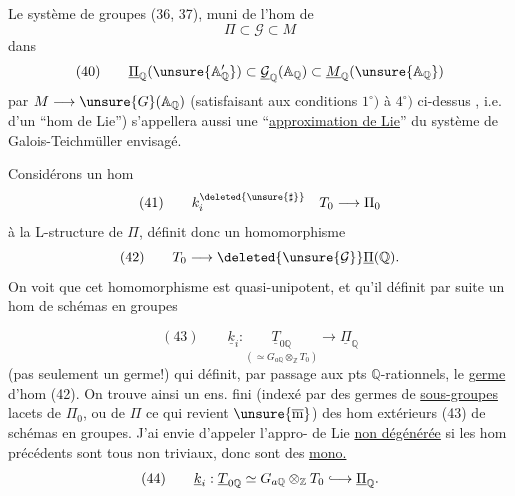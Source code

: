 Le système de groupes  (36, 37), muni
de l'hom de
\[
\Pi \subset \mathcal{G} \subset M
\]
dans 
\[
(40)\qquad
\underline{\Pi}_{\mathbb{Q}}(\unsure{\mathbb{A}'_{\mathbb{Q}}})
\subset \underline{\mathcal{G}}_{\mathbb{Q}}(\mathbb{A}_{\mathbb{Q}})
\subset \underline{M}_{\mathbb{Q}}(\unsure{\mathbb{A}_{\mathbb{Q}}})
\]
  par
$M\longrightarrow \unsure{G}(\mathbb{A}_{\mathbb{Q}})$ (satisfaisant
aux conditions $1^\circ)$ à $4^\circ)$ ci-dessus \deleted{\unsure{)}}, i.e.
d'un ``hom de Lie'') s'appellera aussi
une ``\uline{approximation de Lie}'' du
système de Galois-Teichmüller envisagé.

Considérons un hom
\[
(41)\qquad k_i^{\deleted{\unsure{\sharp}}}\quad T_0\longrightarrow\Pi_0
\]
 à la L-structure de $\Pi$,
définit donc 
un homomorphisme
\[
(42)\qquad T_0\longrightarrow
\deleted{\unsure{\mathcal{G}}}\underline{\Pi}(\mathbb{Q}).
\]
On voit  que cet  homomorphisme
est quasi-unipotent, et qu'il définit par
suite un hom de  schémas en groupes

\[
(43)\qquad \underline{k}_i:
\underset{(\simeq G_{a\mathbb{Q}}\otimes_{\mathbb{Z}}T_0)}{\underline{T}_{0\mathbb{Q}}}
\longrightarrow \underline{\Pi}_{\mathbb{Q}}
\]
(pas seulement un germe!)
qui définit, par  passage aux
pts $\mathbb{Q}$-rationnels, le \uline{germe} d'hom
(42). On trouve ainsi un ens. fini
(indexé par  des germes de \uline{sous-groupes}
lacets de $\Pi_0$, ou de $\Pi$ ce qui revient 
$\unsure{\overline{\mathrm m}}$) des hom extérieurs (43) de schémas
en groupes. J'ai envie d'appeler l'appro- de Lie \uline{non dégénérée} si
les hom précédents sont tous non
triviaux, donc sont des \uline{mono.}
\[
(44)\qquad \underline{k}_i:
\underline{T}_{0\mathbb{Q}}\simeq G_{a\mathbb{Q}}\otimes_{\mathbb{Z}}T_0
\lhook\joinrel\longrightarrow \underline{\Pi}_{\mathbb{Q}}.
\]


